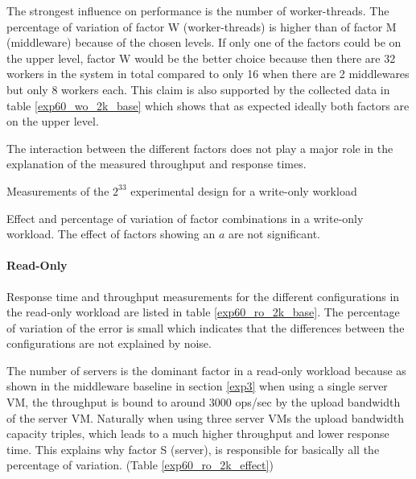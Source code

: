 \documentclass[report.tex]{subfiles}
\begin{document}
The strongest influence on performance is the number of worker-threads. 
The percentage of variation of factor W (worker-threads) is higher than of factor M (middleware) because of the chosen levels. If only one of the factors could be on the upper level, factor W would be the better choice 
because then there are 32 workers in the system in total compared to only 16 when there are 2 middlewares but only 8 workers each. This claim is also supported by the collected data in table \ref{exp60_wo_2k_base} which shows that as expected ideally both factors are on the upper level.

The interaction between the different factors does not play a major role in the explanation of the measured throughput and response times.	

\begin{table}[H]
	\centering
	\small{
		\setlength{\tabcolsep}{3.9pt}
		
		\caption{Measurements of the $2^33$ experimental design for a write-only workload}\label{exp60_wo_2k_base} 
	}
\end{table}

\vspace{-3mm}
\begin{table}[H]
	\small{
		\centering	
		\setlength{\tabcolsep}{4.1pt}
		\newcommand{\rlft}[0]{\raggedleft\arraybackslash}
		
		\caption{Effect and percentage of variation of factor combinations in a write-only workload. The effect of factors showing an $a$ are not significant.}\label{exp60_wo_2k_effect}
	}
\end{table}


\vspace{-8mm}
\paragraph{Read-Only}

Response time and throughput measurements for the different configurations in the read-only workload are listed in table \ref{exp60_ro_2k_base}. The percentage of variation of the error is small which indicates that the differences between the configurations are not explained by noise. 

The number of servers is the dominant factor in a read-only workload because as shown in the middleware baseline in section \ref{exp3} when using a single server VM, the throughput is bound to around 3000 ops/sec by the upload bandwidth of the server VM. Naturally when using three server VMs the upload bandwidth capacity triples, which leads to a much higher throughput and lower response time. This explains why factor S (server), is responsible for basically all the percentage of variation. (Table \ref{exp60_ro_2k_effect})
\end{document}
